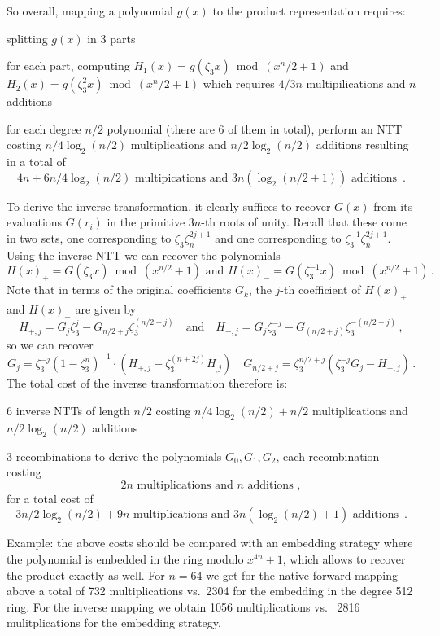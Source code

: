So overall, mapping a polynomial $g(x)$ to the product representation requires:
\bit
\item splitting $g(x)$ in 3 parts
\item for each part, computing $H_1(x) = g(\zeta_3 x) \bmod (x^n/2+1)$ and $H_2(x) = g(\zeta_3^2 x) \bmod (x^n/2 + 1)$ 
which requires $4/3n$ multipilications and $n$ additions
\item for each degree $n/2$ polynomial (there are 6 of them in total), perform an NTT costing $n/4 \log_2(n/2)$ multiplications and $n/2 \log_2(n/2)$
additions
\eit
resulting in a total of 
\[  4n + 6n/4 \log_2(n/2) \text{ multipications  and } 3 n (\log_2(n/2 + 1)) \text{ additions } \, .   \]

To derive the inverse transformation, it clearly suffices to recover $G(x)$ from its evaluations
$G(r_i)$ in the primitive $3n$-th roots of unity.  Recall that these come in two sets, 
one corresponding to $\zeta_3 \zeta_n^{2j+1}$ and one corresponding to $\zeta_3^{-1} \zeta_n^{2j+1}$.
Using the inverse NTT we can recover the polynomials 
\[ H(x)_+ = G(\zeta_3 x) \bmod (x^{n/2} + 1) \text{ and } H(x)_- = G(\zeta_3^{-1} x) \bmod (x^{n/2} + 1) \, .  \]
Note that in terms of the original coefficients $G_k$, the $j$-th coefficient of $H(x)_+$ and $H(x)_-$ are given by
\[  H_{+,j} = G_j \zeta_3^j - G_{n/2+j} \zeta_3^{(n/2+j)} \quad \text{and} \quad   H_{-,j} = G_j \zeta_3^{-j} - G_{(n/2+j)} \zeta_3^{-(n/2+j)}  \, , \]
so we can recover 
\[
G_j = \zeta_3^{-j} (1 - \zeta_3^{n})^{-1} \cdot  (H_{+, j} - \zeta_3^{(n+2j)} H_{_,j}) \quad 
G_{n/2 + j} = \zeta_3^{n/2+j} (\zeta_3^{-j} G_j - H_{-,j})  \, . 
\]
The total cost of the inverse transformation therefore is:
\bit
\item 6 inverse NTTs of length $n/2$ costing $n/4 \log_2(n/2) + n/2$ multiplications and $n/2 \log_2(n/2)$ additions
\item 3 recombinations to derive the polynomials $G_0, G_1, G_2$, each recombination costing
\[  2n \text{ multiplications  and } n \text{ additions }   , \]
\eit
for a total cost of 
\[   3n/2 \log_2(n/2) + 9n  \text{ multiplications and } 3n (\log_2(n/2) + 1) \text{ additions } \, .\]

Example: the above costs should be compared with an embedding strategy where the polynomial 
is embedded in the ring modulo $x^{4n}+1$, which allows to recover the product exactly as well.
For $n = 64$ we get for the native forward mapping above a total of 732 multiplications vs.\ 2304
for the embedding in the degree 512 ring.  For the inverse mapping we obtain 1056 multiplications vs. \ 
2816 mulitplications for the embedding strategy.

